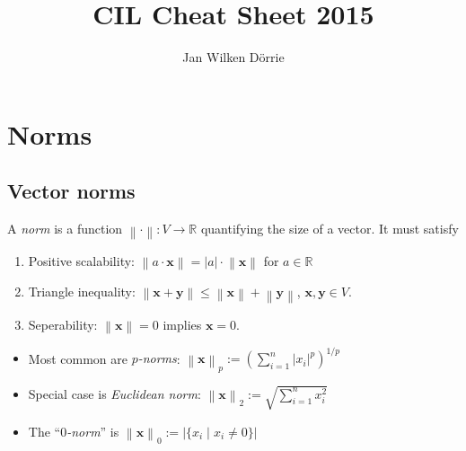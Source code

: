 \documentclass[11pt,a4paper,technote]{IEEEtran}
\newcommand{\card}[1]{\left\lvert#1\right\rvert}
\newcommand{\abs}[1]{\left\lvert#1\right\rvert}
\newcommand{\norm}[1]{\left\lVert#1\right\rVert}
\newcommand{\matr}[1]{\boldsymbol{\mathbf{#1}}}
\newcommand{\vect}[1]{\boldsymbol{\mathbf{#1}}}
\newcommand{\R}{\mathbb{R}}
\begin{document}
\title{CIL Cheat Sheet 2015}
\author{Jan Wilken D\"orrie}
\maketitle

\vspace{-2em}


\section*{Norms}
\subsection*{Vector norms}
A \emph{norm} is a function $\norm{\cdot} : V \to \R$ quantifying the
size of a vector. It must satisfy
\begin{enumerate}
  \item Positive scalability: $\norm{a \cdot \vect{x}} = \abs{a} \cdot
    \norm{\vect{x}}$ for $a \in \R$
  \item Triangle inequality: $\norm{\vect{x} + \vect{y}} \leq
    \norm{\vect{x}} + \norm{\vect{y}}$, $\vect{x}, \vect{y} \in V$.
  \item Seperability: $\norm{\vect{x}} = 0$ implies $\vect{x} = 0$.
\end{enumerate}

\begin{itemize}
  \item Most common are \emph{$p$-norms}:
    \(
      \norm{\vect{x}}_p := {\left(\sum_{i=1}^n \abs{x_i}^p \right)}^{1/p}
    \)
  \item Special case is \emph{Euclidean norm}:
    \( \norm{\vect{x}}_2 := \sqrt{\sum_{i=1}^n x_i^2} \)
  \item The ``\emph{$0$-norm}'' is \( \norm{\vect{x}}_0 := \card{\{x_i \mid x_i
        \neq 0\}} \)
\end{itemize}
\end{document}
